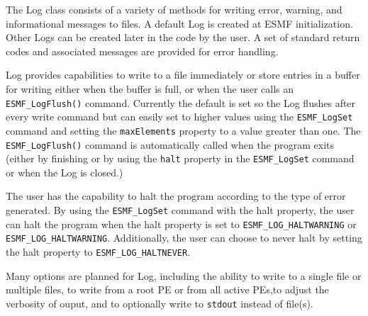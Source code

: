 



The Log class consists of a variety of methods for writing error, warning, and
informational messages to files.  A default Log is created at ESMF
initialization.  Other Logs can be created later in the code by the user.  A set
of standard return codes and associated messages are provided for error 
handling.  

Log provides capabilities to write to a file immediately or store entries in a 
buffer for writing either when the buffer is full, or when the user calls an 
{\tt ESMF\_LogFlush()} command.  Currently the default is set so the Log flushes
after every write command but can easily set to higher values using the 
{\tt ESMF\_LogSet} command and setting the {\tt maxElements} property to a value
greater than one.  The {\tt ESMF\_LogFlush()} command is automatically
called when the program exits (either by finishing or by using the {\tt halt}
property in the {\tt ESMF\_LogSet} command or when the Log is closed.)

The user has the capability to halt the program according to the type of error
generated.  By using the {\tt ESMF\_LogSet} command with the halt property, the
user can halt the program when the halt property is set to 
{\tt ESMF\_LOG\_HALTWARNING} or {\tt ESMF\_LOG\_HALTWARNING}.  Additionally,
the user can choose to never halt by setting the halt property to
{\tt ESMF\_LOG\_HALTNEVER}.

Many options are planned for Log, including the ability to write to a single
file or multiple files, to write from a root PE or from all active PEs,to adjust
the verbosity of ouput, and to optionally write to {\tt stdout} instead of 
file(s).




